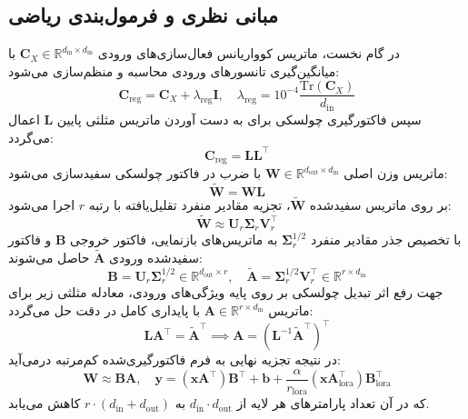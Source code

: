 \subsection{مبانی نظری و فرمول‌بندی ریاضی}
در گام نخست، ماتریس کوواریانس فعال‌سازی‌های ورودی $\mathbf{C}_X \in \mathbb{R}^{d_{\text{in}} \times d_{\text{in}}}$ با میانگین‌گیری تانسورهای ورودی محاسبه و منظم‌سازی می‌شود:
\begin{equation}
\mathbf{C}_{\text{reg}} = \mathbf{C}_X + \lambda_{\text{reg}} \mathbf{I}, \quad \lambda_{\text{reg}} = 10^{-4} \frac{\text{Tr}(\mathbf{C}_X)}{d_{\text{in}}}
\end{equation}
سپس فاکتورگیری چولسکی برای به دست آوردن ماتریس مثلثی پایین $\mathbf{L}$ اعمال می‌گردد:
\begin{equation}
\mathbf{C}_{\text{reg}} = \mathbf{L} \mathbf{L}^\top
\end{equation}
ماتریس وزن اصلی $\mathbf{W} \in \mathbb{R}^{d_{\text{out}} \times d_{\text{in}}}$ با ضرب در فاکتور چولسکی سفیدسازی می‌شود:
\begin{equation}
\widetilde{\mathbf{W}} = \mathbf{W} \mathbf{L}
\end{equation}
بر روی ماتریس سفیدشده $\widetilde{\mathbf{W}}$، تجزیه مقادیر منفرد تقلیل‌یافته با رتبه $r$ اجرا می‌شود:
\begin{equation}
\widetilde{\mathbf{W}} \approx \mathbf{U}_r \mathbf{\Sigma}_r \mathbf{V}_r^\top
\end{equation}
با تخصیص جذر مقادیر منفرد $\mathbf{\Sigma}_r^{1/2}$ به ماتریس‌های بازنمایی، فاکتور خروجی $\mathbf{B}$ و فاکتور سفیدشده ورودی $\widetilde{\mathbf{A}}$ حاصل می‌شوند:
\begin{equation}
\mathbf{B} = \mathbf{U}_r \mathbf{\Sigma}_r^{1/2} \in \mathbb{R}^{d_{\text{out}} \times r}, \quad \widetilde{\mathbf{A}} = \mathbf{\Sigma}_r^{1/2} \mathbf{V}_r^\top \in \mathbb{R}^{r \times d_{\text{in}}}
\end{equation}
جهت رفع اثر تبدیل چولسکی بر روی پایه ویژگی‌های ورودی، معادله مثلثی زیر برای ماتریس $\mathbf{A} \in \mathbb{R}^{r \times d_{\text{in}}}$ با پایداری کامل در دقت  حل می‌گردد:
\begin{equation}
\mathbf{L} \mathbf{A}^\top = \widetilde{\mathbf{A}}^\top \implies \mathbf{A} = (\mathbf{L}^{-1} \widetilde{\mathbf{A}}^\top)^\top
\end{equation}
در نتیجه تجزیه نهایی به فرم فاکتورگیری‌شده کم‌مرتبه درمی‌آید:
\begin{equation}
\mathbf{W} \approx \mathbf{B} \mathbf{A}, \quad \mathbf{y} = (\mathbf{x} \mathbf{A}^\top) \mathbf{B}^\top + \mathbf{b} + \frac{\alpha}{r_{\text{lora}}} (\mathbf{x} \mathbf{A}_{\text{lora}}^\top) \mathbf{B}_{\text{lora}}^\top
\end{equation}
که در آن تعداد پارامترهای هر لایه از $d_{\text{in}} \cdot d_{\text{out}}$ به $r \cdot (d_{\text{in}} + d_{\text{out}})$ کاهش می‌یابد.

